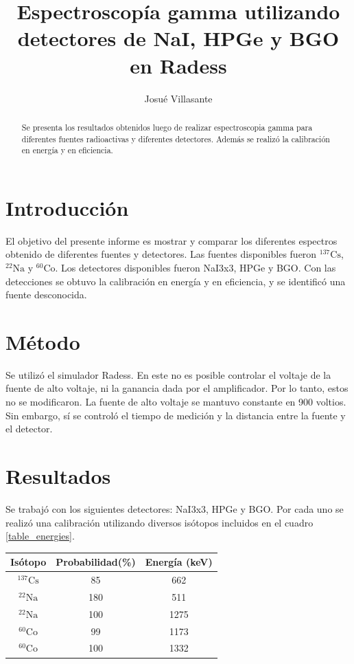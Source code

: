 \documentclass[a4paper, onecolumn]{article}
\author{Josué Villasante}
\title{Espectroscopía gamma utilizando detectores de NaI, HPGe y BGO en Radess}
\begin{document}
	\maketitle
	\begin{abstract}
		Se presenta los resultados obtenidos luego de realizar espectroscopia gamma para diferentes fuentes radioactivas y diferentes detectores. Además se realizó la calibración en energía y en eficiencia.
	\end{abstract}

	\section{Introducción}
		El objetivo del presente informe es mostrar y comparar los diferentes espectros obtenido de diferentes fuentes y detectores. Las fuentes disponibles fueron ${}^{137}\mathrm{Cs}$, ${}^{22}\mathrm{Na}$ y ${}^{60}\mathrm{Co}$. Los detectores disponibles fueron NaI3x3, HPGe y BGO. Con las detecciones se obtuvo la calibración en energía y en eficiencia, y se identificó una fuente desconocida.
	\section{Método}
		Se utilizó el simulador Radess. En este no es posible controlar el voltaje de la fuente de alto voltaje, ni la ganancia dada por el amplificador. Por lo tanto, estos no se modificaron. La fuente de alto voltaje se mantuvo constante en 900 voltios. Sin embargo, sí se controló el tiempo de medición y la distancia entre la fuente y el detector.

	\section{Resultados}	
		Se trabajó con los siguientes detectores: NaI3x3, HPGe y BGO. Por cada uno se realizó una calibración utilizando diversos isótopos incluidos en el cuadro \ref{table_energies}.

		\begin{center}
			{\renewcommand{\arraystretch}{1.5}
			\renewcommand{\tabcolsep}{0.2cm}
			\label{table_energies}
			\begin{tabular}{ c c c }
				\hline
				Isótopo & Probabilidad(\%) & Energía (keV) \\
				\hline
				${}^{137}\mathrm{Cs}$ & 85 & 662 \\ 
				${}^{22}\mathrm{Na}$ & 180 & 511 \\ 
				${}^{22}\mathrm{Na}$ & 100 & 1275 \\ 
				${}^{60}\mathrm{Co}$ & 99 & 1173 \\ 
				${}^{60}\mathrm{Co}$ & 100 & 1332 \\
				\hline
			\end{tabular}}
		\end{center}
\end{document}
